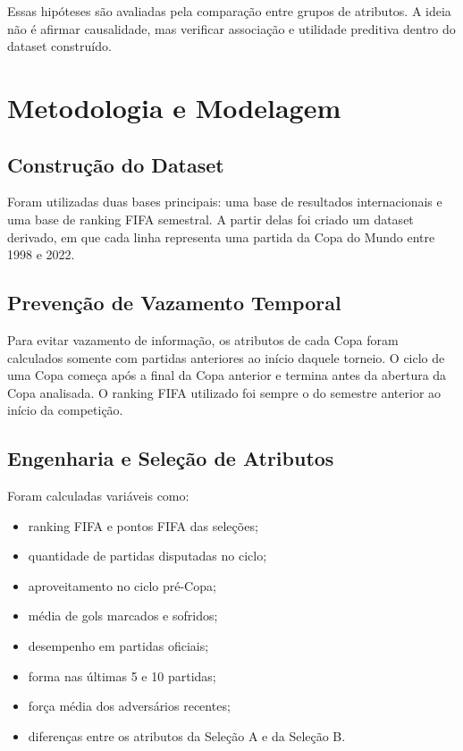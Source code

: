 \documentclass[12pt,a4paper]{article}
\begin{document}
Essas hipóteses são avaliadas pela comparação entre grupos de atributos. A ideia
não é afirmar causalidade, mas verificar associação e utilidade preditiva dentro
do dataset construído.

\section{Metodologia e Modelagem}

\subsection{Construção do Dataset}

Foram utilizadas duas bases principais: uma base de resultados internacionais e
uma base de ranking FIFA semestral. A partir delas foi criado um dataset
derivado, em que cada linha representa uma partida da Copa do Mundo entre 1998 e
2022.

\subsection{Prevenção de Vazamento Temporal}

Para evitar vazamento de informação, os atributos de cada Copa foram calculados
somente com partidas anteriores ao início daquele torneio. O ciclo de uma Copa
começa após a final da Copa anterior e termina antes da abertura da Copa
analisada. O ranking FIFA utilizado foi sempre o do semestre anterior ao início
da competição.

\subsection{Engenharia e Seleção de Atributos}

Foram calculadas variáveis como:

\begin{itemize}
    \item ranking FIFA e pontos FIFA das seleções;
    \item quantidade de partidas disputadas no ciclo;
    \item aproveitamento no ciclo pré-Copa;
    \item média de gols marcados e sofridos;
    \item desempenho em partidas oficiais;
    \item forma nas últimas 5 e 10 partidas;
    \item força média dos adversários recentes;
    \item diferenças entre os atributos da Seleção A e da Seleção B.
\end{itemize}
\end{document}
